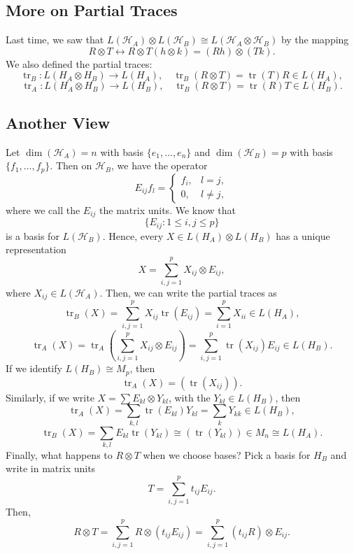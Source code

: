\documentclass[12pt]{article}
\theoremstyle{definition}
\DeclareMathOperator{\tr}{tr}
\begin{document}
\subsection{More on Partial Traces}

Last time, we saw that $L(\mathcal{H}_A) \otimes L(\mathcal{H}_B) \cong L(\mathcal{H}_A \otimes \mathcal{H}_B)$ by the mapping
\[
R \otimes T \leftrightarrow R \otimes T(h \otimes k) = (Rh) \otimes (Tk).
\]
We also defined the partial traces:
\[
\tr_B : L(H_A \otimes H_B) \to L(H_A), \quad \tr_B(R \otimes T)=\tr(T)R \in L(H_A),
\]
\[
\tr_A : L(H_A \otimes H_B) \to L(H_B), \quad \tr_B(R \otimes T)=\tr(R)T \in L(H_B).
\]

\subsection{Another View}

Let $\dim(\mathcal{H}_A)=n$ with basis $\{e_1,\ldots,e_n\}$ and $\dim(\mathcal{H}_B)=p$ with basis $\{f_1,\ldots,f_p\}$. Then on $\mathcal{H}_B$, we have the operator
\[
E_{ij}f_l = \begin{cases}f_i, & l=j,\\0, & l\neq j,\end{cases}
\]
where we call the $E_{ij}$ the matrix units. We know that
\[
\{E_{ij}:1\leq i,j\leq p\}
\]
is a basis for $L(\mathcal{H}_B)$. Hence, every $X \in L(H_A) \otimes L(H_B)$ has a unique representation
\[
X = \sum_{i,j=1}^p X_{ij} \otimes E_{ij},
\]
where $X_{ij} \in L(\mathcal{H}_A)$. Then, we can write the partial traces as
\[
\tr_B(X) = \sum_{i,j=1}^p X_{ij}\tr(E_{ij}) = \sum_{i=1}^p X_{ii} \in L(H_A),
\]
\[
\tr_A(X) = \tr_A\left(\sum_{i,j=1}^p X_{ij} \otimes E_{ij}\right) = \sum_{i,j=1}^p \tr(X_{ij})E_{ij} \in L(H_B).
\]
If we identify $L(H_B) \cong M_p$, then
\[
\tr_A(X) = (\tr(X_{ij})).
\]
Similarly, if we write $X = \sum E_{kl} \otimes Y_{kl}$, with the $Y_{kl} \in L(H_B)$, then
\[
\tr_A(X) = \sum_{k,l} \tr(E_{kl})Y_{kl} = \sum_k Y_{kk} \in L(H_B),
\]
\[
\tr_B(X) = \sum_{k,l} E_{kl}\tr(Y_{kl}) \cong (\tr(Y_{kl})) \in M_n \cong L(H_A).
\]
Finally, what happens to $R \otimes T$ when we choose bases? Pick a basis for $H_B$ and write in matrix units
\[
T = \sum_{i,j=1}^p t_{ij}E_{ij}.
\]
Then,
\[
R \otimes T = \sum_{i,j=1}^p R \otimes (t_{ij}E_{ij}) = \sum_{i,j=1}^p (t_{ij}R) \otimes E_{ij}.
\]
\end{document}
